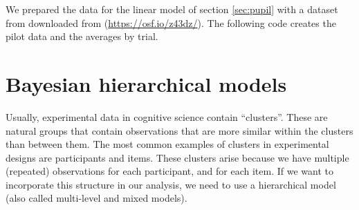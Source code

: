 \documentclass[12pt,]{krantz}
\newenvironment{Shaded}{\begin{snugshade}}{\end{snugshade}}
\newcommand{\CommentTok}[1]{\textcolor[rgb]{0.56,0.35,0.01}{\textit{#1}}}
\newcommand{\DataTypeTok}[1]{\textcolor[rgb]{0.13,0.29,0.53}{#1}}
\newcommand{\DecValTok}[1]{\textcolor[rgb]{0.00,0.00,0.81}{#1}}
\newcommand{\KeywordTok}[1]{\textcolor[rgb]{0.13,0.29,0.53}{\textbf{#1}}}
\newcommand{\NormalTok}[1]{#1}
\newcommand{\OperatorTok}[1]{\textcolor[rgb]{0.81,0.36,0.00}{\textbf{#1}}}
\newcommand{\OtherTok}[1]{\textcolor[rgb]{0.56,0.35,0.01}{#1}}
\newcommand{\StringTok}[1]{\textcolor[rgb]{0.31,0.60,0.02}{#1}}
\theoremstyle{definition}
\theoremstyle{definition}
\theoremstyle{definition}
\theoremstyle{remark}
\begin{document}
We prepared the data for the linear model of section \ref{sec:pupil} with a dataset from \citet{wahnPupilSizesScale2016} downloaded from (\url{https://osf.io/z43dz/}). The following code creates the pilot data and the averages by trial.

\begin{Shaded}
\end{Shaded}

\hypertarget{bayesian-hierarchical-models}{%
\chapter{Bayesian hierarchical models}\label{bayesian-hierarchical-models}}

Usually, experimental data in cognitive science contain ``clusters''. These are natural groups that contain observations that are more similar within the clusters than between them.
The most common examples of clusters in experimental designs are participants and items. These clusters arise because we have multiple (repeated) observations for each participant, and for each item. If we want to incorporate this structure in our analysis, we need to use a hierarchical model (also called multi-level and mixed models).
\end{document}
